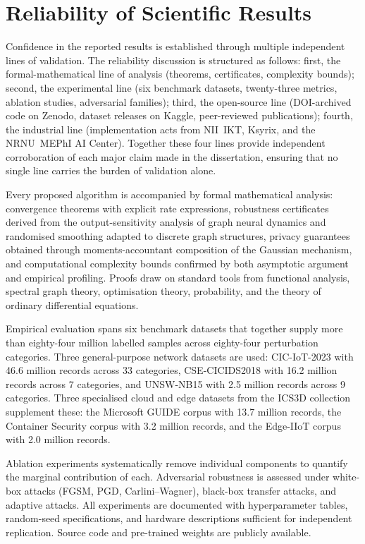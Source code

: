 \section*{Reliability of Scientific Results}

Confidence in the reported results is established through multiple independent lines of validation. The reliability discussion is structured as follows: first, the formal-mathematical line of analysis (theorems, certificates, complexity bounds); second, the experimental line (six benchmark datasets, twenty-three metrics, ablation studies, adversarial families); third, the open-source line (DOI-archived code on Zenodo, dataset releases on Kaggle, peer-reviewed publications); fourth, the industrial line (implementation acts from NII~IKT, Ksyrix, and the NRNU~MEPhI AI Center). Together these four lines provide independent corroboration of each major claim made in the dissertation, ensuring that no single line carries the burden of validation alone.

Every proposed algorithm is accompanied by formal mathematical analysis: convergence theorems with explicit rate expressions, robustness certificates derived from the output-sensitivity analysis of graph neural dynamics and randomised smoothing adapted to discrete graph structures, privacy guarantees obtained through moments-accountant composition of the Gaussian mechanism, and computational complexity bounds confirmed by both asymptotic argument and empirical profiling. Proofs draw on standard tools from functional analysis, spectral graph theory, optimisation theory, probability, and the theory of ordinary differential equations.

Empirical evaluation spans six benchmark datasets that together supply more than eighty-four million labelled samples across eighty-four perturbation categories. Three general-purpose network datasets are used: CIC-IoT-2023 with 46.6 million records across 33 categories, CSE-CICIDS2018 with 16.2 million records across 7 categories, and UNSW-NB15 with 2.5 million records across 9 categories. Three specialised cloud and edge datasets from the ICS3D collection supplement these: the Microsoft GUIDE corpus with 13.7 million records, the Container Security corpus with 3.2 million records, and the Edge-IIoT corpus with 2.0 million records.

Ablation experiments systematically remove individual components to quantify the marginal contribution of each. Adversarial robustness is assessed under white-box attacks (FGSM, PGD, Carlini--Wagner), black-box transfer attacks, and adaptive attacks. All experiments are documented with hyperparameter tables, random-seed specifications, and hardware descriptions sufficient for independent replication. Source code and pre-trained weights are publicly available.

